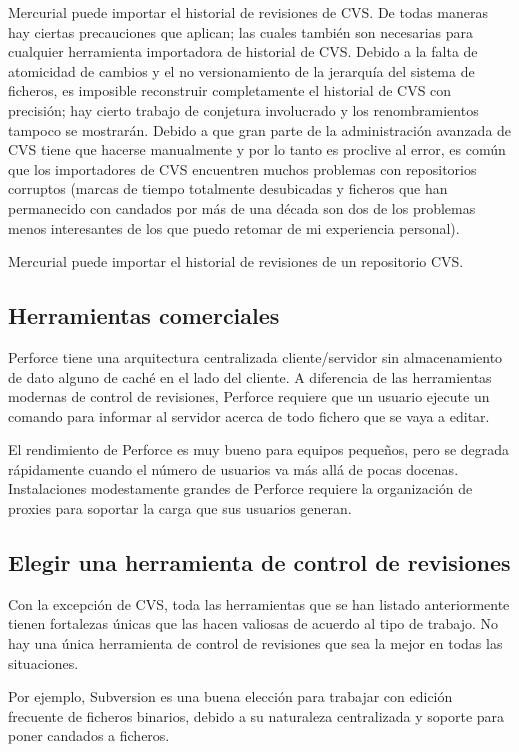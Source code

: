 Mercurial puede importar el historial de revisiones de CVS.  De todas
maneras hay ciertas precauciones que aplican; las cuales también son
necesarias para cualquier herramienta importadora de historial de
CVS. Debido a la falta de atomicidad de cambios y el no versionamiento
de la jerarquía del sistema de ficheros, es imposible reconstruir
completamente el historial de CVS con precisión; hay cierto trabajo de
conjetura involucrado y los renombramientos tampoco se
mostrarán. Debido a que gran parte de la administración avanzada de
CVS tiene que hacerse manualmente y por lo tanto es proclive al error,
es común que los importadores de CVS encuentren muchos problemas con
repositorios corruptos (marcas de tiempo totalmente desubicadas y
ficheros que han permanecido con candados por más de una década son
dos de los problemas menos interesantes de los que puedo retomar de mi
experiencia personal).

Mercurial puede importar el historial de revisiones de un repositorio
CVS.

\subsection{Herramientas comerciales}

Perforce tiene una arquitectura centralizada cliente/servidor sin
almacenamiento de dato alguno de caché en el lado del cliente. A diferencia de
las herramientas modernas de control de revisiones, Perforce requiere
que un usuario ejecute un comando para informar al servidor acerca de
todo fichero que se vaya a editar.

El rendimiento de Perforce es muy bueno para equipos pequeños, pero se
degrada rápidamente cuando el número de usuarios va más allá de pocas
docenas. Instalaciones modestamente grandes de Perforce requiere la
organización de proxies para soportar la carga que sus usuarios generan.

\subsection{Elegir una herramienta de control de revisiones}

Con la excepción de CVS, toda las herramientas que se han listado
anteriormente tienen fortalezas únicas que las hacen valiosas de acuerdo al
tipo de trabajo. No hay una única herramienta de control de revisiones
que sea la mejor en todas las situaciones.

Por ejemplo, Subversion es una buena elección para trabajar con
edición frecuente de ficheros binarios, debido a su naturaleza
centralizada y soporte para poner candados a ficheros.

